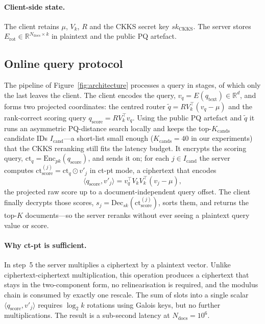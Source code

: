 \documentclass[11pt,a4paper]{article}
\begin{document}
\paragraph{Client-side state.} The client retains $\mu$, $V_k$, $R$ and
the CKKS secret key $sk_{\mathrm{CKKS}}$. The server stores
$E_{\mathrm{rot}} \in \mathbb{R}^{N_{\mathrm{docs}} \times k}$ in plaintext
and the public PQ artefact.

\subsection{Online query protocol}\label{ssec:online}

The pipeline of Figure~\ref{fig:architecture} processes a query in stages, of
which only the last leaves the client. The client encodes the query,
$v_q = E(q_{\mathrm{text}}) \in \mathbb{R}^d$, and forms two projected
coordinates: the centred router
$\widetilde q=R V_k^\top(v_q-\mu)$ and the rank-correct scoring query
$q_{\mathrm{score}}=R V_k^\top v_q$. Using the public PQ artefact and
$\widetilde q$ it runs an asymmetric PQ-distance search locally and
keeps the top-$K_{\mathrm{cands}}$ candidate IDs $I_{\mathrm{cand}}$---a
short-list small enough ($K_{\mathrm{cands}} = 40$ in our experiments) that the
CKKS reranking still fits the latency budget. It encrypts the scoring query,
$\mathrm{ct}_q = \mathrm{Enc}_{pk}(q_{\mathrm{score}})$, and sends it on; for each
$j \in I_{\mathrm{cand}}$ the server computes
$\mathrm{ct}_{\mathrm{score}}^{(j)} = \mathrm{ct}_q \odot v'_j$ in ct-pt mode,
a ciphertext that encodes
\[
\langle q_{\mathrm{score}},v'_j\rangle
=v_q^\top V_kV_k^\top(v_j-\mu),
\]
the projected raw score up to a document-independent query offset. The client finally decrypts those scores,
$s_j = \mathrm{Dec}_{sk}(\mathrm{ct}_{\mathrm{score}}^{(j)})$, sorts them, and
returns the top-$K$ documents---so the server reranks without ever seeing a
plaintext query value or score.

\paragraph{Why ct-pt is sufficient.} In step~5 the server multiplies a
ciphertext by a plaintext vector. Unlike ciphertext-ciphertext
multiplication, this operation produces a ciphertext that stays in the
two-component form, no relinearisation is required, and the modulus chain
is consumed by exactly one rescale. The sum of slots into a single
scalar $\langle q_{\mathrm{score}}, v'_j \rangle$ requires $\log_2 k$ rotations using
Galois keys, but no further multiplications. The result is a sub-second
latency at $N_{\mathrm{docs}} = 10^6$.
\end{document}
